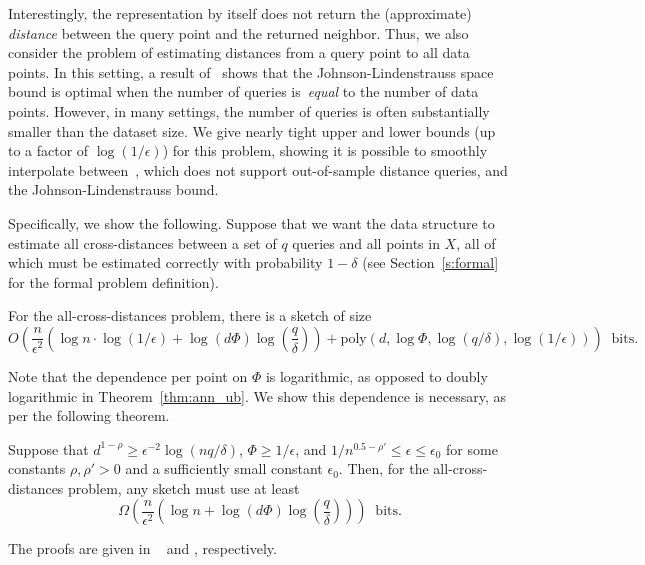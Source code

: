 Interestingly, the  representation by itself does not return the  (approximate) {\em distance} between the query point and the returned neighbor. 
Thus, we also consider the problem of estimating distances from a query point to all data points.
In this setting, a result of~\cite{molinaro2013beating} shows that the Johnson-Lindenstrauss space bound is optimal when the number of queries is~\emph{equal} to the number of data points.
However, in many settings, the number of queries is often substantially smaller than the dataset size.
We give nearly tight upper and lower bounds (up to a factor of $\log(1/\epsilon)$) for this problem, showing it is possible to smoothly interpolate between~\cite{indyk2017near}, which does not support out-of-sample distance queries, and the Johnson-Lindenstrauss bound. 

Specifically, we show the following. Suppose that we want the data structure to estimate all cross-distances between a set of $q$ queries and all points in $X$, all of which must be estimated correctly with probability $1-\delta$ (see Section~\ref{s:formal} for the formal problem definition).


\begin{theorem}\label{thm:distances_ub}
For the all-cross-distances problem, there is a sketch of size
\[ O\left(\frac{n}{\epsilon^2}\left(\log n\cdot\log(1/\epsilon) + \log(d\Phi)\log\left(\frac{q}{\delta}\right)\right) + \mathrm{poly}(d,\log\Phi,\log(q/\delta),\log(1/\epsilon))\right) \;\;  \text{bits.} \]
\end{theorem}
Note that  the dependence per point on $\Phi$ is logarithmic, as opposed to doubly logarithmic in Theorem~\ref{thm:ann_ub}.
We show this dependence is necessary, as per the following theorem. 
\begin{theorem}\label{thm:distances_lb}
Suppose that $d^{1-\rho}\geq\epsilon^{-2}\log(nq/\delta)$, $\Phi\geq1/\epsilon$, and $1/n^{0.5-\rho'}\leq\epsilon\leq\epsilon_0$ for some constants $\rho,\rho'>0$ and a sufficiently small constant $\epsilon_0$.
Then, for the all-cross-distances problem, any sketch must use at least
\[ \Omega\left(\frac{n}{\epsilon^2}\left(\log n + \log(d\Phi)\log\left(\frac{q}{\delta}\right)\right)\right) \;\; \text{bits.} \]
\end{theorem}
The proofs are given in ~ and , respectively. 

